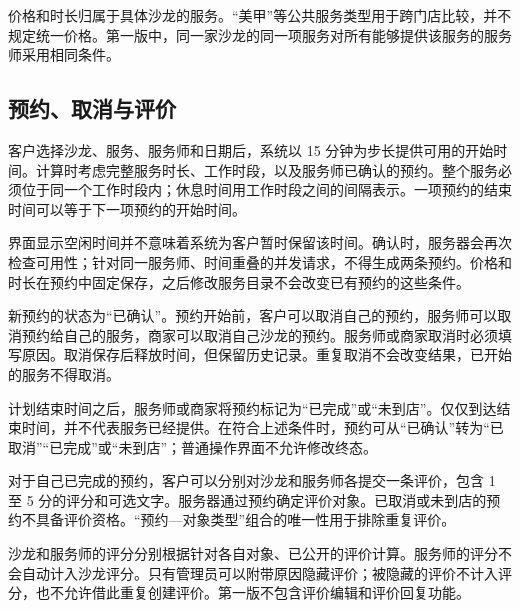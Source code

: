 价格和时长归属于具体沙龙的服务。“美甲”等公共服务类型用于跨门店比较，并不规定统一价格。第一版中，同一家沙龙的同一项服务对所有能够提供该服务的服务师采用相同条件。

\subsection{预约、取消与评价}
客户选择沙龙、服务、服务师和日期后，系统以 15 分钟为步长提供可用的开始时间。计算时考虑完整服务时长、工作时段，以及服务师已确认的预约。整个服务必须位于同一个工作时段内；休息时间用工作时段之间的间隔表示。一项预约的结束时间可以等于下一项预约的开始时间。

界面显示空闲时间并不意味着系统为客户暂时保留该时间。确认时，服务器会再次检查可用性；针对同一服务师、时间重叠的并发请求，不得生成两条预约。价格和时长在预约中固定保存，之后修改服务目录不会改变已有预约的这些条件。

新预约的状态为“已确认”。预约开始前，客户可以取消自己的预约，服务师可以取消预约给自己的服务，商家可以取消自己沙龙的预约。服务师或商家取消时必须填写原因。取消保存后释放时间，但保留历史记录。重复取消不会改变结果，已开始的服务不得取消。

计划结束时间之后，服务师或商家将预约标记为“已完成”或“未到店”。仅仅到达结束时间，并不代表服务已经提供。在符合上述条件时，预约可从“已确认”转为“已取消”“已完成”或“未到店”；普通操作界面不允许修改终态。

对于自己已完成的预约，客户可以分别对沙龙和服务师各提交一条评价，包含 1 至 5 分的评分和可选文字。服务器通过预约确定评价对象。已取消或未到店的预约不具备评价资格。“预约—对象类型”组合的唯一性用于排除重复评价。

沙龙和服务师的评分分别根据针对各自对象、已公开的评价计算。服务师的评分不会自动计入沙龙评分。只有管理员可以附带原因隐藏评价；被隐藏的评价不计入评分，也不允许借此重复创建评价。第一版不包含评价编辑和评价回复功能。

